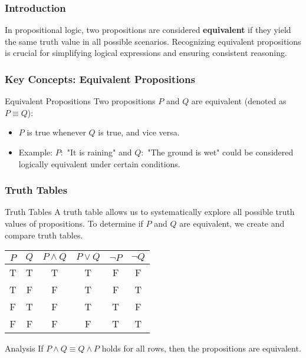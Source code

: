 \documentclass[aspectratio=169]{beamer}
\begin{document}
\begin{frame}[fragile]
    \frametitle{Introduction}
    In propositional logic, two propositions are considered \textbf{equivalent} if they yield the same truth value in all possible scenarios. Recognizing equivalent propositions is crucial for simplifying logical expressions and ensuring consistent reasoning.
\end{frame}

\begin{frame}[fragile]
    \frametitle{Key Concepts: Equivalent Propositions}
    \begin{block}{Equivalent Propositions}
        Two propositions \( P \) and \( Q \) are equivalent (denoted as \( P \equiv Q \)):
        \begin{itemize}
            \item \( P \) is true whenever \( Q \) is true, and vice versa.
            \item Example: \( P: \) "It is raining" and \( Q: \) "The ground is wet" could be considered logically equivalent under certain conditions.
        \end{itemize}
    \end{block}
\end{frame}

\begin{frame}[fragile]
    \frametitle{Truth Tables}
    \begin{block}{Truth Tables}
        A truth table allows us to systematically explore all possible truth values of propositions. 
        To determine if \( P \) and \( Q \) are equivalent, we create and compare truth tables.
    \end{block}
    \begin{center}
        \begin{tabular}{|c|c|c|c|c|c|}
            \hline
            \( P \) & \( Q \) & \( P \land Q \) & \( P \lor Q \) & \( \neg P \) & \( \neg Q \) \\ 
            \hline
            T       & T       & T                & T               & F            & F            \\ 
            T       & F       & F                & T               & F            & T            \\ 
            F       & T       & F                & T               & T            & F            \\ 
            F       & F       & F                & F               & T            & T            \\ 
            \hline
        \end{tabular}
    \end{center}
    \begin{block}{Analysis}
        If \( P \land Q \equiv Q \land P \) holds for all rows, then the propositions are equivalent.
    \end{block}
\end{frame}
\end{document}
